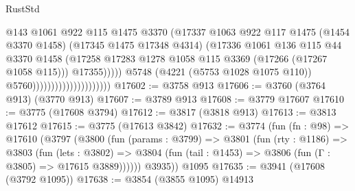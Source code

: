 \begin{lexlean}{RustStd}
\begin{coremodule}
                                                    @143
                                                    @1061
                                                    @922
                                                    @115
                                                    @1475
                                                    @3370
                                                    (@17337
                                                      @1063
                                                      @922
                                                      @117
                                                      @1475
                                                      (@1454 @3370 @1458)
                                                      (@17345 @1475 @17348 @4314)
                                                      (@17336
                                                        @1061
                                                        @136
                                                        @115
                                                        @44
                                                        @3370
                                                        @1458
                                                        (@17258
                                                          @17283
                                                          @1278
                                                          @1058
                                                          @115
                                                          @3369
                                                          (@17266 (@17267 @1058 @115)))
                                                        @17355)))))
                                              @5748
                                              (@4221 (@5753 @1028 @1075 @110))
                                              @5760)))))))))))))))))))))
@17602 := @3758 @913
@17606 := @3760 (@3764 @913) (@3770 @913)
@17607 := @3789 @913
@17608 := @3779 @17607
@17610 := @3775 (@17608 @3794)
@17612 := @3817 (@3818 @913)
@17613 := @3813 @17612
@17615 := @3775 (@17613 @3842)
@17632 := @3774
    (fun (fn : @98) =>
    @17610
      (@3797
        (@3800
          (fun (params : @3799) =>
          @3801
            (fun (rty : @1186) =>
            @3803
              (fun (lets : @3802) =>
              @3804 (fun (tail : @1453) => @3806 (fun (Γ : @3805) => @17615 @3889))))))
        @3935))
    @1095
@17635 := @3941 (@17608 (@3792 @1095))
@17638 := @3854 (@3855 @1095) @14913

\end{coremodule}
\end{lexlean}

